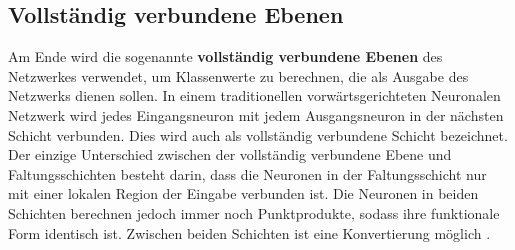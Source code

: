 \subsection{Vollständig verbundene Ebenen}
Am Ende wird die sogenannte \textbf{vollständig verbundene Ebenen} des Netzwerkes verwendet, um Klassenwerte zu berechnen, die als Ausgabe des Netzwerks dienen sollen. In einem traditionellen vorwärtsgerichteten Neuronalen Netzwerk wird jedes Eingangsneuron mit jedem Ausgangsneuron in der nächsten Schicht verbunden. Dies wird auch als vollständig verbundene Schicht bezeichnet. Der einzige Unterschied zwischen der vollständig verbundene Ebene und Faltungsschichten besteht darin, dass die Neuronen in der Faltungsschicht nur mit einer lokalen Region der Eingabe verbunden ist. Die Neuronen in beiden Schichten berechnen jedoch immer noch Punktprodukte, sodass ihre funktionale Form identisch ist. Zwischen beiden Schichten ist eine Konvertierung möglich \cite*{StanfordUniversityCoursecs231n2018a}.


